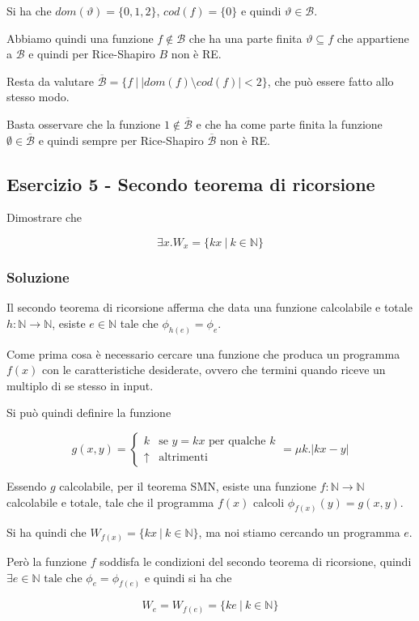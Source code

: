 Si ha che $dom(\vartheta) = \{0,1,2\}$, $cod(f) = \{0\}$ e quindi $\vartheta \in \mathcal{B}$.

Abbiamo quindi una funzione $f \notin \mathcal{B}$ che ha una parte finita $\vartheta \subseteq f$ che appartiene a $\mathcal{B}$ e quindi per Rice-Shapiro $B$ non è RE.

Resta da valutare $\overline{\mathcal{B}} = \{ f \: | \: |dom(f) \setminus cod(f)| < 2 \}$, che può essere fatto allo stesso modo.

Basta osservare che la funzione $1 \notin \overline{\mathcal{B}}$  e che ha come parte finita la funzione $\emptyset \in \overline{\mathcal{B}}$ e quindi sempre per Rice-Shapiro $\overline{\mathcal{B}}$ non è RE.


\subsection{Esercizio 5 - Secondo teorema di ricorsione}

Dimostrare che 

$$
 \exists x . W_x = \{ kx \: | \: k \in \mathbb{N} \}
$$

\subsubsection{Soluzione}

Il secondo teorema di ricorsione afferma che data una funzione calcolabile e totale $h : \mathbb{N} \rightarrow \mathbb{N}$, esiste $e \in \mathbb{N}$ tale che $\phi_{h(e)} = \phi_e$.

Come prima cosa è necessario cercare una funzione che produca un programma $f(x)$ con le caratteristiche desiderate, ovvero che termini quando riceve un multiplo di se stesso in input.

Si può quindi definire la funzione

$$
g(x,y) = \begin{cases}
k &\text{se } y = kx \text{ per qualche }k \\
 \uparrow &\text{altrimenti}
\end{cases} = \mu k . |kx - y|
$$

Essendo $g$ calcolabile, per il teorema SMN, esiste una funzione $f : \mathbb{N} \rightarrow \mathbb{N}$ calcolabile e totale, tale che il programma $f(x)$ calcoli $\phi_{f(x)}(y) = g(x,y)$.

Si ha quindi che $W_{f(x)} =  \{ kx \: | \: k \in \mathbb{N} \}$, ma noi stiamo cercando un programma $e$.
	
Però la funzione $f$ soddisfa le condizioni del secondo teorema di ricorsione, quindi $\exists e \in \mathbb{N} \text{ tale che } \phi_e = \phi_{f(e)}$ e quindi si ha che

$$
W_e = W_{f(e)} =  \{ ke \: | \: k \in \mathbb{N} \}
$$